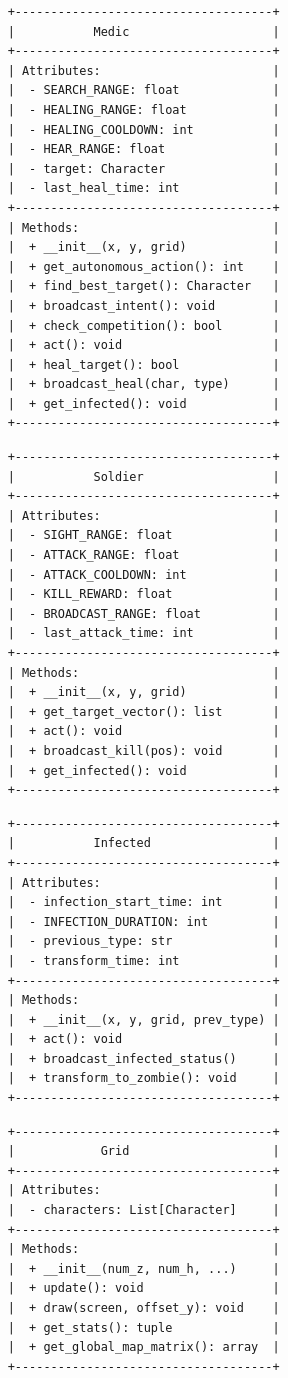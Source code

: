 \documentclass[12pt,a4paper]{article}
\begin{document}
\begin{verbatim}
	+------------------------------------+
	|           Medic                    |
	+------------------------------------+
	| Attributes:                        |
	|  - SEARCH_RANGE: float             |
	|  - HEALING_RANGE: float            |
	|  - HEALING_COOLDOWN: int           |
	|  - HEAR_RANGE: float               |
	|  - target: Character               |
	|  - last_heal_time: int             |
	+------------------------------------+
	| Methods:                           |
	|  + __init__(x, y, grid)            |
	|  + get_autonomous_action(): int    |
	|  + find_best_target(): Character   |
	|  + broadcast_intent(): void        |
	|  + check_competition(): bool       |
	|  + act(): void                     |
	|  + heal_target(): bool             |
	|  + broadcast_heal(char, type)      |
	|  + get_infected(): void            |
	+------------------------------------+
\end{verbatim}
\begin{verbatim}
	+------------------------------------+
	|           Soldier                  |
	+------------------------------------+
	| Attributes:                        |
	|  - SIGHT_RANGE: float              |
	|  - ATTACK_RANGE: float             |
	|  - ATTACK_COOLDOWN: int            |
	|  - KILL_REWARD: float              |
	|  - BROADCAST_RANGE: float          |
	|  - last_attack_time: int           |
	+------------------------------------+
	| Methods:                           |
	|  + __init__(x, y, grid)            |
	|  + get_target_vector(): list       |
	|  + act(): void                     |
	|  + broadcast_kill(pos): void       |
	|  + get_infected(): void            |
	+------------------------------------+
\end{verbatim}
\begin{verbatim}
	+------------------------------------+
	|           Infected                 |
	+------------------------------------+
	| Attributes:                        |
	|  - infection_start_time: int       |
	|  - INFECTION_DURATION: int         |
	|  - previous_type: str              |
	|  - transform_time: int             |
	+------------------------------------+
	| Methods:                           |
	|  + __init__(x, y, grid, prev_type) |
	|  + act(): void                     |
	|  + broadcast_infected_status()     |
	|  + transform_to_zombie(): void     |
	+------------------------------------+
\end{verbatim}
\begin{verbatim}
	+------------------------------------+
	|            Grid                    |
	+------------------------------------+
	| Attributes:                        |
	|  - characters: List[Character]     |
	+------------------------------------+
	| Methods:                           |
	|  + __init__(num_z, num_h, ...)     |
	|  + update(): void                  |
	|  + draw(screen, offset_y): void    |
	|  + get_stats(): tuple              |
	|  + get_global_map_matrix(): array  |
	+------------------------------------+
\end{verbatim}
\end{document}
